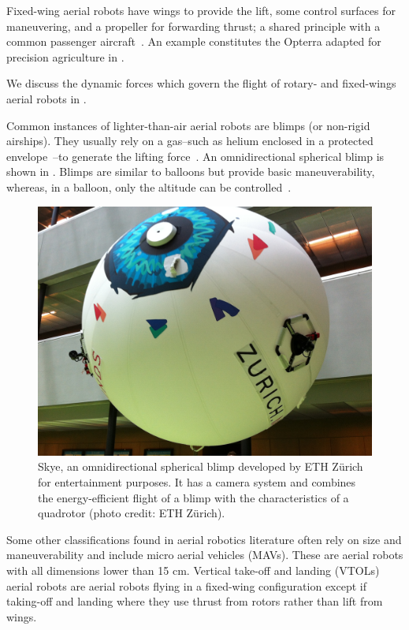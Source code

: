 Fixed-wing aerial robots have wings to provide the lift, some control surfaces for maneuvering, and a propeller for forwarding thrust; a shared principle with a common passenger aircraft~\citep{corke2017robotics}. An example constitutes the Opterra adapted for precision agriculture in .

We discuss the dynamic forces which govern the flight of rotary- and fixed-wings aerial robots in .

Common instances of lighter-than-air aerial robots are blimps (or non-rigid airships). They usually rely on a gas--such as helium enclosed in a protected envelope~\citep{burri2013design}--to generate the lifting force~\citep{fui2017recent}. An omnidirectional spherical blimp is shown in . Blimps are similar to balloons but provide basic maneuverability, whereas, in a balloon, only the altitude can be controlled~\citep{colombatti2011lighter}.

\begin{figure}[h]
  \centering
  \includegraphics[width=.7\textwidth]{pictures/IMG_2612}
  \caption[Skye, an omnidirectional spherical blimp]{Skye, an omnidirectional spherical blimp developed by ETH Z\"urich for entertainment purposes. It has a camera system and combines the energy-efficient flight of a blimp with the characteristics of a quadrotor {\scriptsize(photo credit: ETH Z\"urich)}.}   
  \label{fig:skye-blimp}
\end{figure}

Some other classifications found in aerial robotics literature often rely on size and maneuverability and include micro aerial vehicles (MAVs). These are aerial robots with all dimensions lower than 15 cm. Vertical take-off and landing (VTOLs) aerial robots are aerial robots flying in a fixed-wing configuration except if taking-off and landing where they use thrust from rotors rather than lift from wings. 

